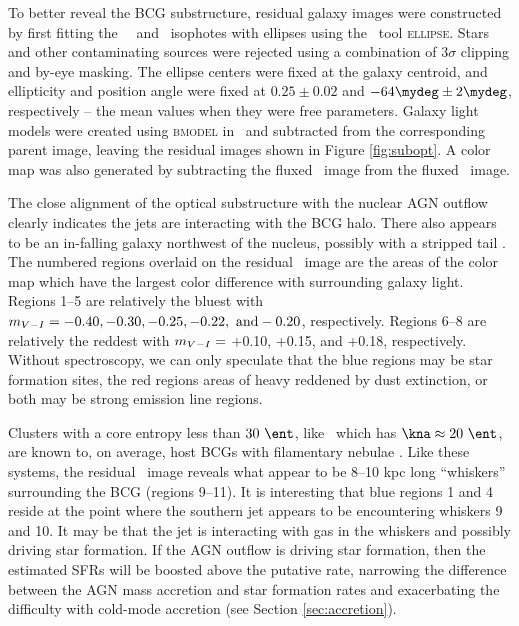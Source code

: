 \documentclass[11pt, preprint]{aastex}
\begin{document}
To better reveal the BCG substructure, residual galaxy images were
constructed by first fitting the \hst\ \myv\ and \myi\ isophotes with
ellipses using the \iraf\ tool {\textsc{ellipse}}. Stars and other
contaminating sources were rejected using a combination of $3\sigma$
clipping and by-eye masking. The ellipse centers were fixed at the
galaxy centroid, and ellipticity and position angle were fixed at
$0.25 \pm 0.02$ and $-64\mydeg \pm 2\mydeg$, respectively -- the mean
values when they were free parameters. Galaxy light models were
created using {\textsc{bmodel}} in \iraf\ and subtracted from the
corresponding parent image, leaving the residual images shown in
Figure \ref{fig:subopt}. A color map was also generated by subtracting
the fluxed \myi\ image from the fluxed \myv\ image.

The close alignment of the optical substructure with the nuclear AGN
outflow clearly indicates the jets are interacting with the BCG
halo. There also appears to be an in-falling galaxy northwest of the
nucleus, possibly with a stripped tail \citep[see][for
  example]{2007ApJ...671..190S}. The numbered regions overlaid on the
residual \myv\ image are the areas of the color map which have the
largest color difference with surrounding galaxy light. Regions 1--5
are relatively the bluest with $m_{V-I} = -0.40, -0.30, -0.25,
-0.22, ~\rm{and} -0.20$, respectively. Regions 6--8 are relatively the
reddest with $m_{V-I} =$ +0.10, +0.15, and +0.18,
respectively. Without spectroscopy, we can only speculate that the
blue regions may be star formation sites, the red regions areas of
heavy reddened by dust extinction, or both may be strong emission line
regions.

Clusters with a core entropy less than $30 ~\ent$, like \rbs\ which
has $\kna \approx 20 ~\ent$, are known to, on average, host BCGs with
filamentary nebulae \citep[\eg][]{mcdonald10}. Like these systems, the
residual \myi\ image reveals what appear to be 8--10 kpc long
``whiskers'' surrounding the BCG (regions 9--11). It is interesting
that blue regions 1 and 4 reside at the point where the southern jet
appears to be encountering whiskers 9 and 10. It may be that the jet
is interacting with gas in the whiskers and possibly driving star
formation. If the AGN outflow is driving star formation, then the
estimated SFRs will be boosted above the putative rate, narrowing the
difference between the AGN mass accretion and star formation rates and
exacerbating the difficulty with cold-mode accretion (see Section
\ref{sec:accretion}).
\end{document}
